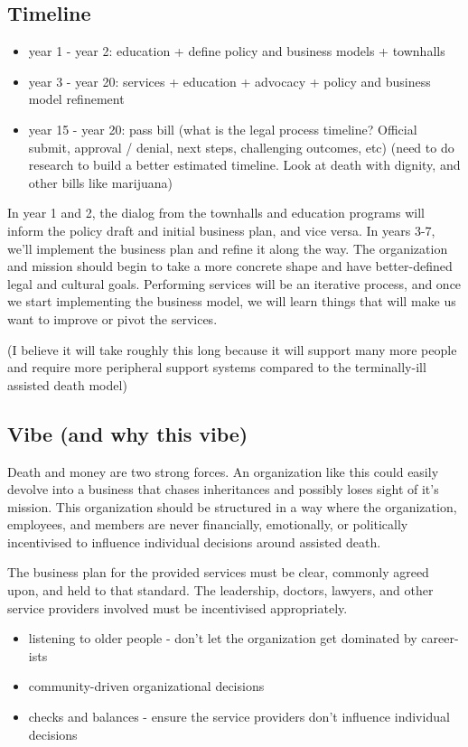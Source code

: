 \documentclass{proposalnsf}
\begin{document}
\subsection{Timeline} 
      \begin{itemize}
        \item{year 1 - year 2: education + define policy and business models + townhalls}
        \item{year 3 - year 20: services + education + advocacy + policy and business model refinement}
        \item{year 15 - year 20: pass bill (what is the legal process timeline? Official submit, approval / denial, next steps, challenging outcomes, etc) (need to do research to build a better estimated timeline. Look at death with dignity, and other bills like marijuana)}
      \end{itemize}


In year 1 and 2, the dialog from the townhalls and education programs will inform the policy draft and initial business plan, and vice versa. In years 3-7, we'll implement the business plan and refine it along the way. The organization and mission should begin to take a more concrete shape and have better-defined legal and cultural goals. Performing services will be an iterative process, and once we start implementing the business model, we will learn things that will make us want to improve or pivot the services.

(I believe it will take roughly this long because it will support many more people and require more peripheral support systems compared to the terminally-ill assisted death model)

\subsection{Vibe (and why this vibe)}
Death and money are two strong forces. An organization like this could easily devolve into a business that chases inheritances and possibly loses sight of it's mission. This organization should be structured in a way where the organization, employees, and members are never financially, emotionally, or politically incentivised to influence individual decisions around assisted death.

The business plan for the provided services must be clear, commonly agreed upon, and held to that standard. The leadership, doctors, lawyers, and other service providers involved must be incentivised appropriately.

\bigskip
{}
      \begin{itemize}
        \item{listening to older people - don't let the organization get dominated by career-ists}
        \item{community-driven organizational decisions}
        \item{checks and balances - ensure the service providers don't influence individual decisions}
      \end{itemize}
\end{document}
